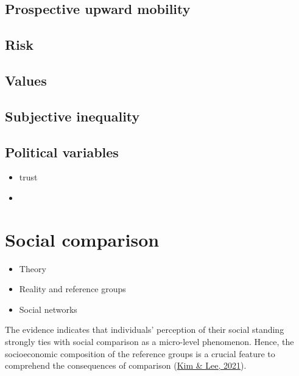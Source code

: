 \documentclass[
  12pt,
]{book}
\providecommand{\tightlist}{%
  \setlength{\itemsep}{0pt}\setlength{\parskip}{0pt}}
\begin{document}
\hypertarget{prospective-upward-mobility}{%
\section{Prospective upward mobility}\label{prospective-upward-mobility}}

\hypertarget{risk}{%
\section{Risk}\label{risk}}

\hypertarget{values}{%
\section{Values}\label{values}}

\hypertarget{subjective-inequality}{%
\section{Subjective inequality}\label{subjective-inequality}}

\hypertarget{political-variables}{%
\section{Political variables}\label{political-variables}}

\begin{itemize}
\tightlist
\item
  trust
\item
\end{itemize}

\hypertarget{social-comparison}{%
\chapter{Social comparison}\label{social-comparison}}

\begin{itemize}
\item
  Theory
\item
  Reality and reference groups
\item
  Social networks
\end{itemize}

The evidence indicates that individuals' perception of their social standing strongly ties with social comparison as a micro-level phenomenon. Hence, the socioeconomic composition of the reference groups is a crucial feature to comprehend the consequences of comparison (\protect\hyperlink{ref-kim_social_2021}{Kim \& Lee, 2021}).
\end{document}
